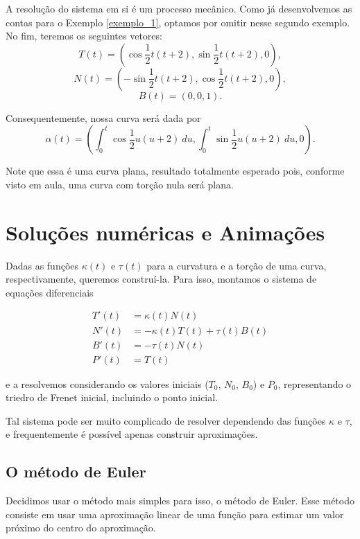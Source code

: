 \documentclass{article}
\begin{document}
A resolução do sistema em si é um processo mecânico. Como já desenvolvemos as contas para o Exemplo \ref{exemplo_1}, optamos por omitir nesse segundo exemplo. No fim, teremos os seguintes vetores:
\[T(t) = \left(\cos{\dfrac{1}{2}t(t + 2)}, \sin{\dfrac{1}{2}t(t + 2)}, 0\right),\]
\[N(t) = \left(-\sin{\dfrac{1}{2}t(t + 2)}, \cos{\dfrac{1}{2}t(t + 2)}, 0\right),\]
\[B(t) = \left(0, 0, 1\right).\]

Consequentemente, nossa curva será dada por
\[\alpha(t) = \left(\int_0^t \cos{\dfrac{1}{2}u(u + 2)} ~du, \int_0^t \sin{\dfrac{1}{2}u(u + 2)} ~du, 0\right).\]

Note que essa é uma curva plana, resultado totalmente esperado pois, conforme visto em aula, uma curva com torção nula será plana.

\section{Soluções numéricas e Animações}

Dadas as funções $\kappa(t)$ e $\tau(t)$ para a curvatura e a torção de uma curva, respectivamente, queremos construí-la. Para isso, montamos o sistema de equações diferenciais

\begin{equation}
    \begin{split}
        T'(t) & = \kappa(t) N(t) \\
        N'(t) & = -\kappa(t) T(t) + \tau(t) B(t) \\
        B'(t) & = -\tau(t) N(t) \\
        P'(t) & = T(t)
    \end{split}
    \label{euler1}
\end{equation}
    
e a resolvemos considerando os valores iniciais ($T_0$, $N_0$, $B_0$) e $P_0$, representando o triedro de Frenet inicial, incluindo o ponto inicial.

Tal sistema pode ser muito complicado de resolver dependendo das funções $\kappa$ e $\tau$, e frequentemente é possível apenas construir aproximações.

\subsection{O método de Euler}

Decidimos usar o método mais simples para isso, o método de Euler. Esse método consiste em usar uma aproximação linear de uma função para estimar um valor próximo do centro do aproximação.
\end{document}
